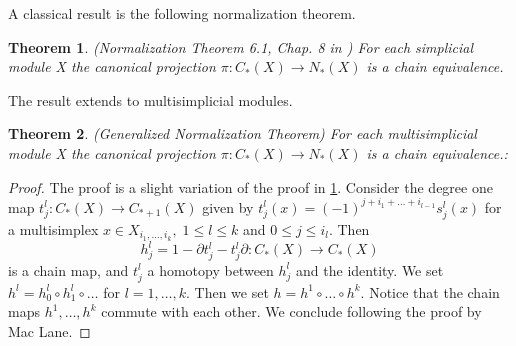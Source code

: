 \documentclass[a4paper,11pt]{article}
\newtheorem{theorem}{Theorem}[section]
\theoremstyle{remark}
\newtheorem{observation}[theorem]{\textbf{Observation}}
\theoremstyle{definition}
\begin{document}
A classical result is the following normalization theorem.
\begin{theorem}(Normalization Theorem 6.1, Chap. 8 in  \cite{maclanehomology})
	\label{normalizationtheorem}
For each simplicial module X the canonical projection $\pi:C_{*}(X)\rightarrow N_*(X)$ is a chain equivalence.
\end{theorem}

The result extends to multisimplicial modules.  


\begin{theorem}(Generalized Normalization Theorem)
   \label{generalizednormalizationtheorem}
For each multisimplicial module X the canonical projection $\pi:C_{*}(X)\rightarrow N_*(X)$ is a chain equivalence.:
\end{theorem}
\begin{proof}
The proof is a slight variation of the proof in \ref{normalizationtheorem}.
Consider the degree one map 
$t_j^l:C_*(X) \to C_{*+1}(X)$   given by $t_j^l(x)=(-1)^{j+i_1+\dots+i_{l-1}} s_j^l(x)$
for a multisimplex $x \in X_{i_1,\dots,i_k}, \; 1 \leq l \leq k$ and $0 \leq j \leq i_l$.
Then $$h_j^l = 1-\partial t_j^l - t_j^l \partial :C_*(X) \to C_*(X)$$ is a chain map,
and $t_j^l$ a homotopy between $h_j^l$ and the identity. We set $h^l =h^l_0 \circ h^l_1 \circ \dots $ for $l=1,\dots,k$. Then we set 
$h= h^1 \circ \dots \circ h^k$. Notice that the chain maps $h^1,\dots,h^k$ commute with each other. We conclude following the proof by Mac Lane.  %
\end{proof}



\end{document}

